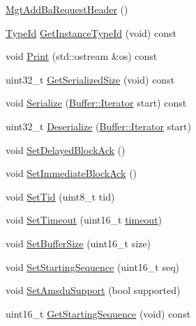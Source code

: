 \begin{DoxyCompactItemize}
\item 
\hyperlink{classns3_1_1MgtAddBaRequestHeader_a6e808c5a38a909735d14499ffa86a496}{Mgt\+Add\+Ba\+Request\+Header} ()
\item 
\hyperlink{classns3_1_1TypeId}{Type\+Id} \hyperlink{classns3_1_1MgtAddBaRequestHeader_a5bc730b9506c187fc3a0e40168de7d8d}{Get\+Instance\+Type\+Id} (void) const 
\item 
void \hyperlink{classns3_1_1MgtAddBaRequestHeader_aea320a6600dae2755d303b4a0f0cf381}{Print} (std\+::ostream \&os) const 
\item 
uint32\+\_\+t \hyperlink{classns3_1_1MgtAddBaRequestHeader_aae6da26d46d3fe7ab5d98387108b0e0f}{Get\+Serialized\+Size} (void) const 
\item 
void \hyperlink{classns3_1_1MgtAddBaRequestHeader_a01eb353911ddac60b43efd72001ae686}{Serialize} (\hyperlink{classns3_1_1Buffer_1_1Iterator}{Buffer\+::\+Iterator} start) const 
\item 
uint32\+\_\+t \hyperlink{classns3_1_1MgtAddBaRequestHeader_a1d362ddc04f57dac191571e79786660d}{Deserialize} (\hyperlink{classns3_1_1Buffer_1_1Iterator}{Buffer\+::\+Iterator} start)
\item 
void \hyperlink{classns3_1_1MgtAddBaRequestHeader_a4c10cc215193951777e401f82953c324}{Set\+Delayed\+Block\+Ack} ()
\item 
void \hyperlink{classns3_1_1MgtAddBaRequestHeader_a6c500c2af17b44cead2c9449ed35bc5f}{Set\+Immediate\+Block\+Ack} ()
\item 
void \hyperlink{classns3_1_1MgtAddBaRequestHeader_af21456709bd3e8a7574eda1627115eb9}{Set\+Tid} (uint8\+\_\+t tid)
\item 
void \hyperlink{classns3_1_1MgtAddBaRequestHeader_aeb99891a5d0299f49a027a346173f9b3}{Set\+Timeout} (uint16\+\_\+t \hyperlink{openflow-switch_8cc_a386d174ae121d1cfa279074b7e209714}{timeout})
\item 
void \hyperlink{classns3_1_1MgtAddBaRequestHeader_a480af17ddad3bf04f0adee28bccd2ef5}{Set\+Buffer\+Size} (uint16\+\_\+t size)
\item 
void \hyperlink{classns3_1_1MgtAddBaRequestHeader_af88f102a8becfc3e0202c4dfb969a05f}{Set\+Starting\+Sequence} (uint16\+\_\+t seq)
\item 
void \hyperlink{classns3_1_1MgtAddBaRequestHeader_a6be7e2f25a4aa78fad33f11466890cd0}{Set\+Amsdu\+Support} (bool supported)
\item 
uint16\+\_\+t \hyperlink{classns3_1_1MgtAddBaRequestHeader_a66a5f1001da0f938b342b81b1330eb15}{Get\+Starting\+Sequence} (void) const 

\end{DoxyCompactItemize}
